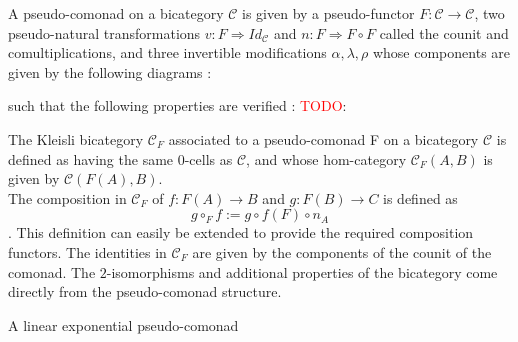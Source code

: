 \documentclass[10pt]{llncs}
\newcommand{\todo}[1]{\textcolor{red}{TODO}: \underline{#1}}
\begin{document}
\begin{definition}
A pseudo-comonad on a bicategory $\mathcal{C}$ is given by a pseudo-functor $F: \mathcal{C} \rightarrow \mathcal{C}$, two pseudo-natural transformations $v:F \Rightarrow Id_{\mathcal{C}}$ and $n: F \Rightarrow F \circ F$ called the counit and comultiplications, and three invertible modifications $ \alpha,\lambda,\rho$ whose components are given by the following diagrams : \\
such that the following properties are verified : 
\todo{}
\end{definition}
\begin{definition}
The Kleisli bicategory $\mathcal{C}_F$ associated to a pseudo-comonad F on a bicategory $\mathcal{C}$ is defined as having the same $0$-cells as $\mathcal{C}$, and whose hom-category $\mathcal{C}_F (A,B)$ is given by $\mathcal{C}(F(A),B)$. \\
The composition in $\mathcal{C}_F$ of $f:F(A)\rightarrow B$ and $g:F(B) \rightarrow C$ is defined as $$g \circ_F f := g \circ f(F) \circ n_A$$.
This definition can easily be extended to provide the required composition functors. The identities in $\mathcal{C}_F$ are given by the components of the counit of the comonad. The $2$-isomorphisms and additional properties of the bicategory come directly from the pseudo-comonad structure.
\end{definition}
\begin{definition}
A linear exponential pseudo-comonad 
\end{definition}
\end{document}
